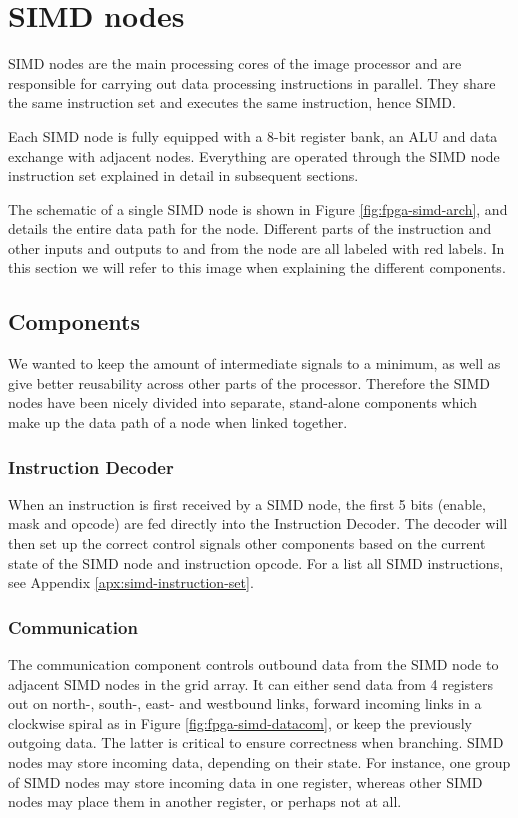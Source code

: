 \section{SIMD nodes}

\ac{SIMD} nodes are the main processing cores of the image processor and are
responsible for carrying out data processing instructions in parallel. They
share the same instruction set and executes the same instruction, hence
\acf{SIMD}.

Each \ac{SIMD} node is fully equipped with a 8-bit register bank, an \ac{ALU} and data exchange with adjacent nodes. Everything are operated through the SIMD node instruction set explained in detail in subsequent sections.

The schematic of a single \ac{SIMD} node is shown in Figure
\ref{fig:fpga-simd-arch}, and details the entire data path for the
node. Different parts of the instruction and other inputs and outputs to and
from the node are all labeled with red labels. In this
section we will refer to this image when explaining the different components.



\subsection{Components}

We wanted to keep the amount of intermediate signals to a minimum, as well as
give better reusability across other parts of the processor. Therefore the SIMD
nodes have been nicely divided into separate, stand-alone components which make
up the data path of a node when linked together.

\subsubsection{Instruction Decoder}

When an instruction is first received by a \ac{SIMD} node, the first 5 bits
(enable, mask and opcode) are fed directly into the Instruction Decoder. The
decoder will then set up the correct control signals other components based on
the current state of the \ac{SIMD} node and instruction opcode. For a list all
\ac{SIMD} instructions, see Appendix \ref{apx:simd-instruction-set}.

\subsubsection{Communication}
The communication component controls outbound data from the \ac{SIMD} node to
adjacent \ac{SIMD} nodes in the grid array. It can either send data from 4
registers out on north-, south-, east- and westbound links, forward incoming
links in a clockwise spiral as in Figure \ref{fig:fpga-simd-datacom}, or keep
the previously outgoing data. The latter is critical to ensure correctness when
branching. \ac{SIMD} nodes may store incoming data, depending on their
state. For instance, one group of \ac{SIMD} nodes may store incoming data in one
register, whereas other \ac{SIMD} nodes may place them in another register, or
perhaps not at all.


